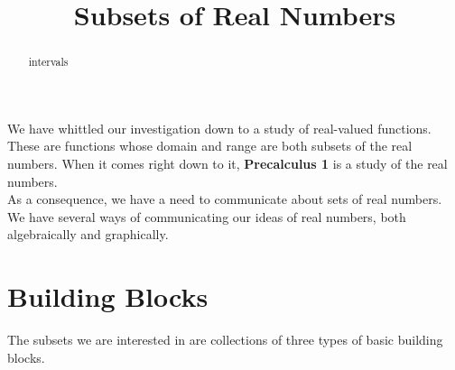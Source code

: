 \documentclass{ximera}
\title{Subsets of Real Numbers}
\begin{document}
\begin{abstract}
intervals
\end{abstract}
\maketitle




We have whittled our investigation down to a study of real-valued functions.  These are functions whose domain and range are both subsets of the real numbers.  When it comes right down to it, \textbf{Precalculus 1} is a study of the real numbers. \\



As a consequence, we have a need to communicate about sets of real numbers.  We have several ways of communicating our ideas of real numbers, both algebraically and graphically.


\section{Building Blocks}

The subsets we are interested in are collections of three types of basic building blocks.
\end{document}
